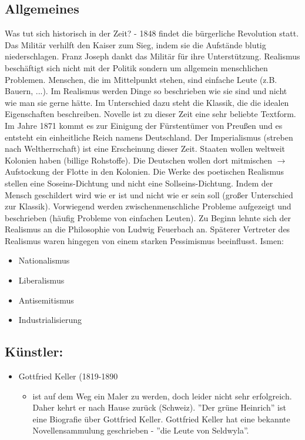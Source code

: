 \documentclass[12pt,a4paper]{article}
\begin{document}
\subsection{Allgemeines}
Was tut sich historisch in der Zeit? - 1848 findet die bürgerliche Revolution statt. Das Militär verhilft den Kaiser zum Sieg, indem sie die Aufstände blutig niederschlagen. Franz Joseph dankt das Militär für ihre Unterstützung.
\newline
\newline
Realismus beschäftigt sich nicht mit der Politik sondern um allgemein menschlichen Problemen. Menschen, die im Mittelpunkt stehen, sind einfache Leute (z.B. Bauern, ...). Im Realismus werden Dinge so beschrieben wie sie sind und nicht wie man sie gerne hätte. Im Unterschied dazu steht die Klassik, die die idealen Eigenschaften beschreiben. Novelle ist zu dieser Zeit eine sehr beliebte Textform.
\newline
\newline
Im Jahre 1871 kommt es zur Einigung der Fürstentümer von Preußen und es entsteht ein einheitliche Reich namens Deutschland. Der Imperialismus (streben nach Weltherrschaft) ist eine Erscheinung dieser Zeit. Staaten wollen weltweit Kolonien haben (billige Rohstoffe). Die Deutschen wollen dort mitmischen $\rightarrow$ Aufstockung der Flotte in den Kolonien.
\newline
\newline
Die Werke des poetischen Realismus stellen eine Soseins-Dichtung und nicht eine Sollseins-Dichtung. Indem der Mensch geschildert wird wie er ist und nicht wie er sein soll (großer Unterschied zur Klassik). Vorwiegend werden zwischenmenschliche Probleme aufgezeigt und beschrieben (häufig Probleme von einfachen Leuten).
\newline
\newline
Zu Beginn lehnte sich der Realismus an die Philosophie von Ludwig Feuerbach an. Späterer Vertreter des Realismus waren hingegen von einem starken Pessimismus beeinflusst.
\newline
\newline
Ismen:
\begin{itemize}
\item Nationalismus
\item Liberalismus
\item Antisemitismus
\item Industrialisierung 
\end{itemize}

\subsection{Künstler:}
\begin{itemize}
\item Gottfried Keller (1819-1890
	\begin{itemize}
	\item ist auf dem Weg ein Maler zu werden, doch leider nicht sehr erfolgreich. Daher kehrt er  nach Hause zurück (Schweiz). ''Der grüne Heinrich'' ist eine Biografie über Gottfried Keller. Gottfried Keller hat eine bekannte Novellensammulung geschrieben - ''die Leute von Seldwyla''.
	\end{itemize}
\end{itemize}
\end{document}
